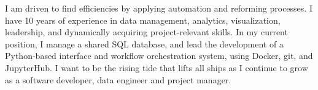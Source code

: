 \smallskip
{} 

\begin{cvparagraph}
\smallskip
I am driven to find efficiencies by applying automation and reforming
processes. I have 10 years of experience in data management, analytics,
visualization, leadership, and dynamically acquiring project-relevant skills.
In my current position, I manage a shared SQL database, and lead the development
of a Python-based interface and workflow orchestration system, using Docker,
git, and JupyterHub. I want to be the rising tide that lifts all ships as I
continue to grow as a software developer, data engineer and project manager.
\end{cvparagraph}

